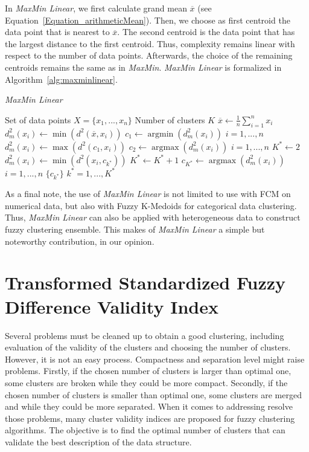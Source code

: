\documentclass[runningheads,a4paper]{llncs}
\DeclareMathOperator*{\argmax}{argmax}
\DeclareMathOperator*{\argmin}{argmin}
\begin{document}
In \textit{MaxMin Linear}, we first calculate grand mean $\overline{x}$ (see Equation~\ref{Equation_arithmeticMean}). Then, we choose as first centroid the data point that is nearest to $\overline{x}$. The second centroid is the data point that has the largest distance to the first centroid. Thus, complexity remains linear with respect to the number of data points. Afterwards, the choice of the remaining centroids remains the same as in \textit{MaxMin}. \textit{MaxMin Linear} is formalized in Algorithm~\ref{alg:maxminlinear}.

\begin{algorithm}
\caption{\textit{MaxMin Linear}}
\label{alg:maxminlinear}
\begin{algorithmic}
	\REQUIRE Set of data points $X = \{x_1,...,x_n\}$
    \REQUIRE Number of clusters $K$
	\STATE {}
    \STATE $\overline{x} \leftarrow \frac{1}{n}\sum_{i=1}^n x_i$ 
	    \STATE $d^2_m(x_i) \leftarrow \min(d^2(\overline{x}, x_i))$ 
	\ENDFOR
	\STATE $c_1 \leftarrow \argmin(d^2_m(x_i))$ $i = 1,...,n$
	    \STATE $d^2_m(x_i) \leftarrow \max(d^2(c_1, x_i))$ 
	\ENDFOR
	\STATE $c_2 \leftarrow \argmax(d^2_m(x_i))$ $i = 1,...,n$
	\STATE $K^* \leftarrow 2$ 
	\STATE {}
			\STATE $d^2_m(x_i) \leftarrow \min(d^2(x_i, c_{k^*}))$
		\ENDFOR
		\STATE $K^* \leftarrow K^* + 1$		
		\STATE $c_{K^*} \leftarrow \argmax(d^2_m(x_i))$ $i = 1,...,n$
	\ENDWHILE
	\RETURN $\{c_{k^*}\}$ $k^* = 1,...,K^*$
\end{algorithmic}
\end{algorithm}

As a final note, the use of \textit{MaxMin Linear} is not limited to use with FCM on numerical data, but also with Fuzzy K-Medoids \cite{park2009simple} for categorical data clustering.
Thus, \textit{MaxMin Linear} can also be applied with heterogeneous data to construct fuzzy clustering ensemble. This makes of \textit{MaxMin Linear} a simple but noteworthy contribution, in our opinion. 

\section{Transformed Standardized Fuzzy Difference Validity Index} 
\label{sec:ContributionValidityIndex}

Several problems must be cleaned up to obtain a good clustering, including evaluation of the validity of the clusters and choosing the number of clusters. However, it is not an easy process. Compactness and separation level might raise problems. Firstly, if the chosen number of clusters is larger than optimal one, some clusters are broken while they could be more compact. Secondly, if the chosen number of clusters is smaller than optimal one, some clusters are merged and while they could be more separated. When it comes to addressing resolve those problems, many cluster validity indices are proposed for fuzzy clustering algorithms. The objective is to find the optimal number of clusters that can validate the best description of the data structure. 
\end{document}
